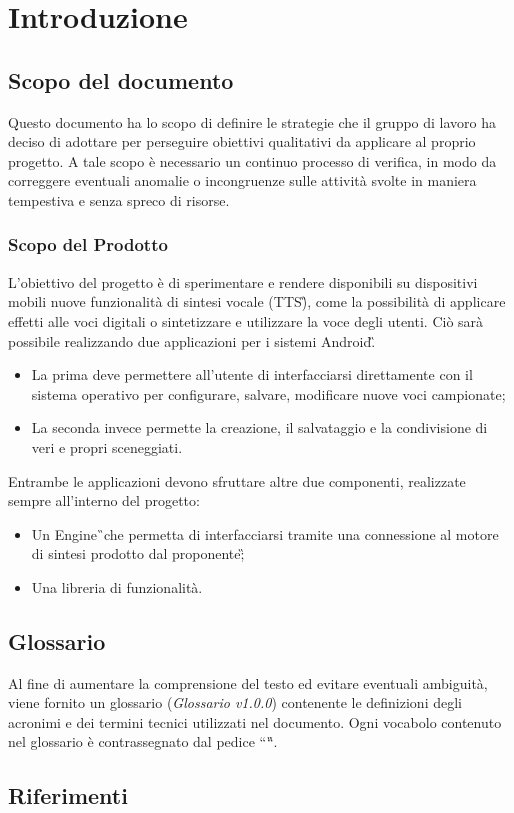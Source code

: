 \section{Introduzione}

\subsection{Scopo del documento}
Questo documento ha lo scopo di definire le strategie che il gruppo di lavoro 
ha deciso di adottare per perseguire obiettivi qualitativi da applicare al 
proprio progetto. A tale scopo è necessario un continuo processo di verifica, 
in modo da correggere eventuali anomalie o incongruenze sulle attività svolte 
in maniera tempestiva e senza spreco di risorse.

\subsubsection{Scopo del Prodotto}
L'obiettivo del progetto è di sperimentare e rendere disponibili su dispositivi 
mobili nuove funzionalità di sintesi vocale (TTS\G), come la possibilità di 
applicare effetti alle voci digitali o sintetizzare e utilizzare la voce degli 
utenti.
Ciò sarà possibile realizzando due applicazioni per i sistemi Android\G.
\begin{itemize}
	\item La prima deve permettere all'utente di interfacciarsi direttamente 
	con il sistema operativo per configurare, salvare, modificare nuove voci 
	campionate;
	\item La seconda invece permette la creazione, il salvataggio e la 
	condivisione di veri e propri sceneggiati.
\end{itemize}
Entrambe le applicazioni devono sfruttare altre due componenti, realizzate 
sempre all'interno del progetto:
\begin{itemize}
	\item Un Engine\G\ che permetta di interfacciarsi tramite una connessione 
	al motore di sintesi prodotto dal proponente\G;
	\item Una libreria di funzionalità.
\end{itemize} 

\subsection{Glossario}
Al fine di aumentare la comprensione del testo ed evitare eventuali ambiguità, 
viene fornito un glossario (\textit{Glossario v1.0.0}) contenente le 
definizioni degli acronimi e dei termini tecnici utilizzati nel documento. Ogni 
vocabolo contenuto nel glossario è contrassegnato dal pedice “\G “.

\subsection{Riferimenti}

\newpage